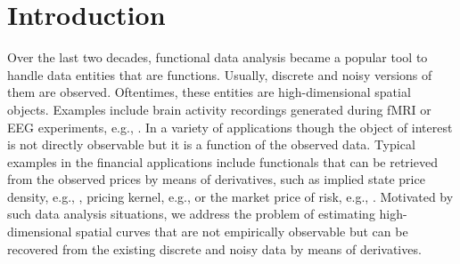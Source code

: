 
\section{Introduction}

Over the last two decades, functional data analysis became a popular tool to handle data entities that are functions. Usually, discrete and noisy versions of them are observed. Oftentimes, these entities are high-dimensional spatial objects. Examples include brain activity recordings generated during fMRI or EEG experiments, e.g., \cite{majer:15}. %
In a variety of applications though the object of interest is not directly observable but it is a function of the observed data.  Typical examples in the financial applications include functionals that can be retrieved from the observed prices by means of derivatives, such as implied state price density, e.g., \cite{Schienle:12}, pricing kernel, e.g., \cite{Gr:13} or the market price of risk, e.g.,  \cite{Lopez:12}. Motivated by such data analysis situations, we address the problem of estimating high-dimensional spatial curves that are not empirically observable but can be recovered from the existing discrete and noisy data by means of derivatives. %


